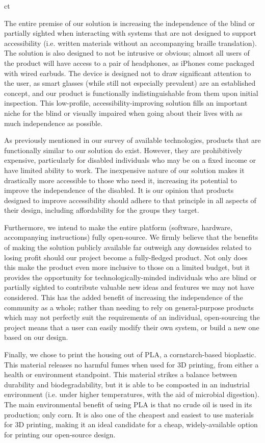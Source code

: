 ct\documentclass[a4paper,11pt]{article}
\begin{document}
The entire premise of our solution is increasing the independence of the blind or partially sighted when interacting with systems that are not designed to support accessibility (i.e. written materials without an accompanying braille translation). The solution is also designed to not be intrusive or obvious; almost all users of the product will have access to a pair of headphones, as iPhones come packaged with wired earbuds. The device is designed not to draw significant attention to the user, as smart glasses (while still not especially prevalent) are an established concept, and our product is functionally indistinguishable from them upon initial inspection. This low-profile, accessibility-improving solution fills an important niche for the blind or visually impaired when going about their lives with as much independence as possible.

As previously mentioned in our survey of available technologies, products that are functionally similar to our solution do exist. However, they are prohibitively expensive, particularly for disabled individuals who may be on a fixed income or have limited ability to work. The inexpensive nature of our solution makes it drastically more accessible to those who need it, increasing its potential to improve the independence of the disabled. It is our opinion that products designed to improve accessibility should adhere to that principle in all aspects of their design, including affordability for the groups they target.

Furthermore, we intend to make the entire platform (software, hardware, accompanying instructions) fully open-source. We firmly believe that the benefits of making the solution publicly available far outweigh any downsides related to losing profit should our project become a fully-fledged product. Not only does this make the product even more inclusive to those on a limited budget, but it provides the opportunity for technologically-minded individuals who are blind or partially sighted to contribute valuable new ideas and features we may not have considered. This has the added benefit of increasing the independence of the community as a whole; rather than needing to rely on general-purpose products which may not perfectly suit the requirements of an individual, open-sourcing the project means that a user can easily modify their own system, or build a new one based on our design.

Finally, we chose to print the housing out of PLA, a cornstarch-based bioplastic. This material releases no harmful fumes when used for 3D printing, from either a health or environment standpoint. This material strikes a balance between durability and biodegradability, but it is able to be composted in an industrial environment (i.e. under higher temperatures, with the aid of microbial digestion). The main environmental benefit of using PLA is that no crude oil is used in its production; only corn. It is also one of the cheapest and easiest to use materials for 3D printing, making it an ideal candidate for a cheap, widely-available option for printing our open-source design.
\end{document}
